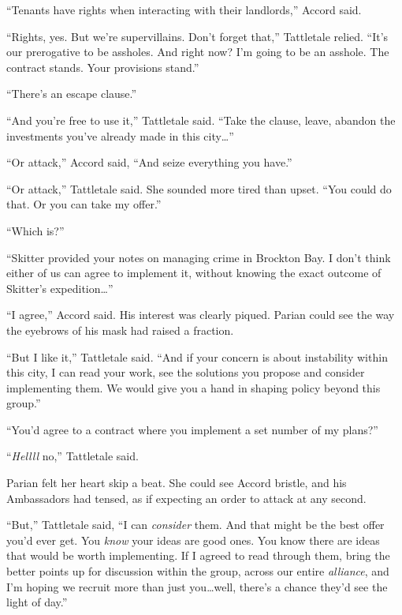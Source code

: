 ``Tenants have rights when interacting with their landlords,'' Accord said.



``Rights, yes.  But we're supervillains.  Don't forget that,'' Tattletale relied.  ``It's our prerogative to be assholes.  And right now?  I'm going to be an asshole.  The contract stands.  Your provisions stand.''



``There's an escape clause.''



``And you're free to use it,'' Tattletale said.  ``Take the clause, leave, abandon the investments you've already made in this city\ldots''



``Or attack,'' Accord said, ``And seize everything you have.''



``Or attack,'' Tattletale said.  She sounded more tired than upset.  ``You could do that.  Or you can take my offer.''



``Which is?''



``Skitter provided your notes on managing crime in Brockton Bay.  I don't think either of us can agree to implement it, without knowing the exact outcome of Skitter's expedition\ldots''



``I agree,'' Accord said.  His interest was clearly piqued.  Parian could see the way the eyebrows of his mask had raised a fraction.



``But I like it,'' Tattletale said.  ``And if your concern is about instability within this city, I can read your work, see the solutions you propose and consider implementing them.  We would give you a hand in shaping policy beyond this group.''



``You'd agree to a contract where you implement a set number of my plans?''



``\emph{Hellll} no,'' Tattletale said.



Parian felt her heart skip a beat.  She could see Accord bristle, and his Ambassadors had tensed, as if expecting an order to attack at any second.



``But,'' Tattletale said, ``I can \emph{consider} them.  And that might be the best offer you'd ever get.  You \emph{know} your ideas are good ones.  You know there are ideas that would be worth implementing.  If I agreed to read through them, bring the better points up for discussion within the group, across our entire \emph{alliance}, and I'm hoping we recruit more than just you\ldots well, there's a chance they'd see the light of day.''



